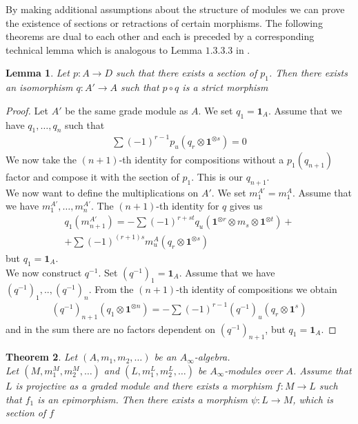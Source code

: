 \documentclass[a4paper, 12pt, openany, fleqn]{amsart}
\newtheorem{theorem}{Theorem}[section]
\newtheorem{lemma}[theorem]{Lemma}
\begin{document}
By making additional assumptions about the structure of modules we can prove the existence of sections or retractions of certain morphisms. The following theorems are dual to each other and each is preceded by a corresponding technical lemma which is analogous to Lemma $1.3.3.3$ in \cite{lefevrehasegawa2003surlesainfinicategories}.
\begin{lemma}
    Let $p:A\longrightarrow D$ such that there exists a section of $p_1$. Then there exists an isomorphism $q:A'\longrightarrow A$ such that $p\circ q$ is a strict morphism
\end{lemma}
\begin{proof}
    Let $A'$ be the same grade module as $A$. We set $q_1 = \mathbf{1}_A$. Assume that we have $q_1,\dots,q_n$ such that
    \begin{align*}
        \sum (-1)^{r-1}p_u(q_r\otimes\mathbf{1}^{\otimes s}) = 0
    \end{align*}
    We now take the $(n+1)$-th identity for compositions without a $p_1(q_{n+1})$ factor and compose it with the section of $p_1$. This is our $q_{n+1}$.\\
    We now want to define the multiplications on $A'$. We set $m_1^{A'}=m_1^A$. Assume that we have $m_1^{A'},\dots,m_n^{A'}$. The $(n+1)$-th identity for $q$ gives us
    \begin{align*}
        q_1(m_{n+1}^{A'}) = -\sum  (-1)^{r+st}q_u(\mathbf{1}^{\otimes r}\otimes m_s \otimes \mathbf{1}^{\otimes t}) +\\ + \sum (-1)^{(r+1)s}m_u^{A}(q_r\otimes\mathbf{1}^{\otimes s})
    \end{align*}
    but $q_1=\mathbf{1}_A$.\\
    We now construct $q^{-1}$. Set $(q^{-1})_1 = \mathbf{1}_A$. Assume that we have $(q^{-1})_1,..,(q^{-1})_n$. From the $(n+1)$-th identity of compositions we obtain
\begin{align*}
    (q^{-1})_{n+1}(q_1\otimes\mathbf{1}^{\otimes n}) = -\sum(-1)^{r-1}(q^{-1})_u(q_r\otimes \mathbf{1}^{s})
\end{align*}
and in the sum there are no factors dependent on $(q^{-1})_{n+1}$, but $q_1 = \mathbf{1}_A$.
\end{proof}
\begin{theorem}
    Let $(A,m_1,m_2,\dots)$ be an $A_\infty$-algebra.\\ Let $(M,m_1^M,m_2^M,\dots)$ and $(L,m_1^L,m_2^L,\dots)$ be $A_\infty$-modules over $A$. Assume that $L$ is projective as a graded module and there exists a morphism $f:M\longrightarrow L$ such that $f_1$ is an epimorphism. Then there exists a morphism $\psi :L\longrightarrow M$, which is section of $f$
\end{theorem}
\end{document}
